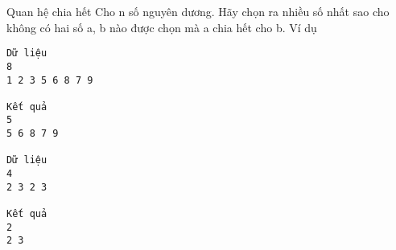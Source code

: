 Quan hệ chia hết
Cho n số nguyên dương. Hãy chọn ra nhiều số nhất sao cho không có hai số a, b nào được chọn mà a chia hết cho b.
Ví dụ
\begin{verbatim}
Dữ liệu
8
1 2 3 5 6 8 7 9

Kết quả
5
5 6 8 7 9

Dữ liệu
4
2 3 2 3

Kết quả
2
2 3
\end{verbatim}